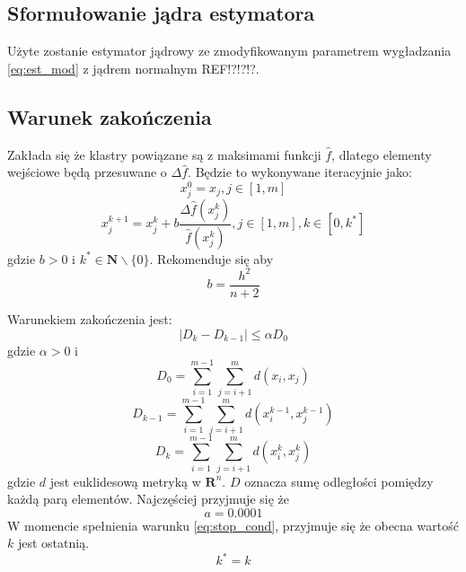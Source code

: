 \subsection{Sformułowanie jądra estymatora}
\label{subsec:jadro_estymatora}
Użyte zostanie estymator jądrowy ze zmodyfikowanym parametrem wygładzania \ref{eq:est_mod} z jądrem normalnym REF!?!?!?.

\subsection{Warunek zakończenia}
\label{subsec:stop_cond}
Zakłada się że klastry powiązane są z maksimami funkcji $\hat{
f}$, dlatego elementy wejściowe będą przesuwane o $\Delta\hat{f}$. Będzie to wykonywane iteracyjnie jako:
\begin{equation}
x^0_j=x_j, j\in [1,m]
\end{equation}
\begin{equation}
x^{k+1}_j=x^k_j+b\frac{\Delta\hat{f}(x^k_j)}{\hat{f}(x^k_j)}, j \in [1,m], k \in [0,k^*]
\end{equation}
gdzie $b > 0$ i $k^* \in \mathbf{N} \backslash \{0\}$. Rekomenduje się aby
\begin{equation}
b=\frac{h^2}{n+2}
\end{equation} 

Warunekiem zakończenia jest:
\begin{equation} \label{eq:stop_cond}
|D_k-D_{k-1}| \leq \alpha D_0
\end{equation}
gdzie $\alpha>0$ i 
\begin{equation}
D_0 = \displaystyle\sum_{i=1}^{m-1} \displaystyle\sum_{j=i+1}^{m} d(x_i, x_j)
\end{equation}
\begin{equation}
D_{k-1} = \displaystyle\sum_{i=1}^{m-1} \displaystyle\sum_{j=i+1}^{m} d(x_i^{k-1}, x_j^{k-1})
\end{equation}
\begin{equation}
D_{k} = \displaystyle\sum_{i=1}^{m-1} \displaystyle\sum_{j=i+1}^{m} d(x_i^{k}, x_j^{k})
\end{equation}
gdzie $d$ jest euklidesową metryką w $\mathbf{R}^n$. $D$ oznacza sumę odległości pomiędzy każdą parą elementów. Najczęściej przyjmuje się że
\begin{equation}
a= 0.0001
\end{equation}
W momencie spełnienia warunku \ref{eq:stop_cond}, przyjmuje się że obecna wartość $k$ jest ostatnią.
\begin{equation}
k^*=k
\end{equation}

